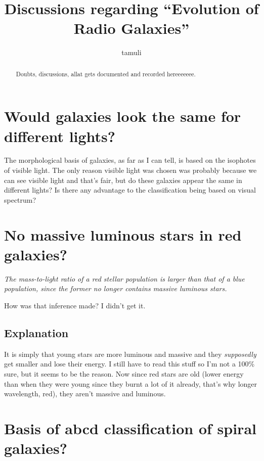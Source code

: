 \documentclass[a4paper,12pt]{article}
\title{Discussions regarding ``Evolution of Radio Galaxies''}
\author{tamuli}
\date{}
\newcommand{\ti}[1]{\textit{#1}}
\begin{document}
\maketitle

\begin{abstract}
  Doubts, discussions, allat gets documented and recorded hereeeeeee.
\end{abstract}

\tableofcontents

\newpage

\section{Would galaxies look the same for different lights?}
The morphological basis of galaxies, as far as I can tell, is based on the isophotes of visible light. The only reason visible light was chosen was probably because we can see visible light and that's fair, but do these galaxies appear the same in different lights? Is there any advantage to the classification being based on visual spectrum?


\section{No massive luminous stars in red galaxies?}

\ti{The mass-to-light ratio of a red stellar population is larger than that of a blue population, since the former no longer contains massive luminous stars.}

\vspace{1em}

How was that inference made? I didn't get it.

\subsection*{Explanation}
It is simply that young stars are more luminous and massive and they \ti{supposedly} get smaller and lose their energy. I still have to read this stuff so I'm not a 100\% sure, but it seems to be the reason. Now since red stars are old (lower energy than when they were young since they burnt a lot of it already, that's why longer wavelength, red), they aren't massive and luminous.

\section{Basis of abcd classification of spiral galaxies?}
\end{document}
